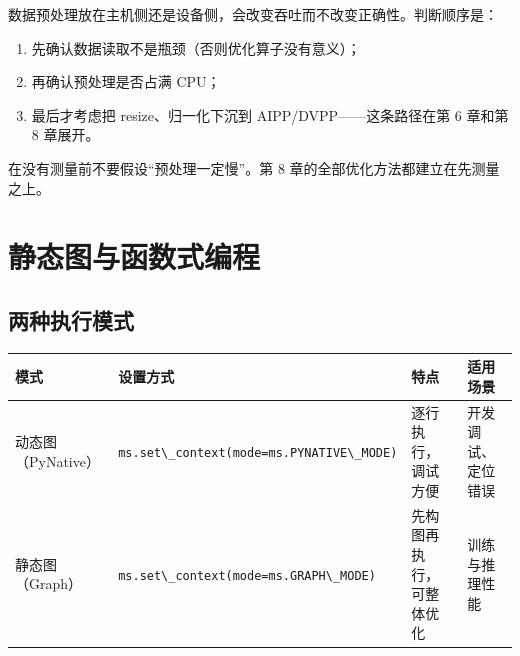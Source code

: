 数据预处理放在主机侧还是设备侧，会改变吞吐而不改变正确性。判断顺序是：

\begin{enumerate}
\def\labelenumi{\arabic{enumi}.}
\tightlist
\item
  先确认数据读取不是瓶颈（否则优化算子没有意义）；
\item
  再确认预处理是否占满 CPU；
\item
  最后才考虑把 resize、归一化下沉到 AIPP/DVPP------这条路径在第 6 章和第
  8 章展开。
\end{enumerate}

在没有测量前不要假设``预处理一定慢''。第 8
章的全部优化方法都建立在先测量之上。

\section{静态图与函数式编程}\label{src-book-chapter5-h16}

\subsection{两种执行模式}\label{src-book-chapter5-h17}

\begin{longtable}[]{@{}
  >{\raggedright\arraybackslash}p{}
  >{\raggedright\arraybackslash}p{}
  >{\raggedright\arraybackslash}p{}
  >{\raggedright\arraybackslash}p{}@{}}
\toprule\noalign{}
\begin{minipage}[b]{\linewidth}\raggedright
模式
\end{minipage} & \begin{minipage}[b]{\linewidth}\raggedright
设置方式
\end{minipage} & \begin{minipage}[b]{\linewidth}\raggedright
特点
\end{minipage} & \begin{minipage}[b]{\linewidth}\raggedright
适用场景
\end{minipage} \\
\midrule\noalign{}
\endhead
\bottomrule\noalign{}
\endlastfoot
动态图（PyNative） &
\passthrough{\lstinline!ms.set\_context(mode=ms.PYNATIVE\_MODE)!} &
逐行执行，调试方便 & 开发调试、定位错误 \\
静态图（Graph） &
\passthrough{\lstinline!ms.set\_context(mode=ms.GRAPH\_MODE)!} &
先构图再执行，可整体优化 & 训练与推理性能 \\
\end{longtable}


